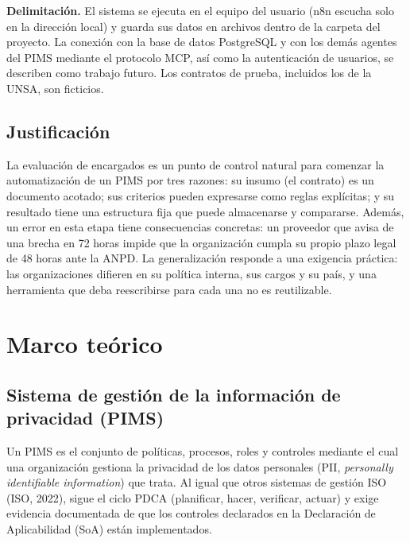 \documentclass[12pt,letterpaper]{article}
\begin{document}
\par\noindent \textbf{Delimitación.} El sistema se ejecuta en el equipo del usuario (n8n escucha solo en la dirección local) y guarda sus datos en archivos dentro de la carpeta del proyecto. La conexión con la base de datos PostgreSQL y con los demás agentes del PIMS mediante el protocolo MCP, así como la autenticación de usuarios, se describen como trabajo futuro. Los contratos de prueba, incluidos los de la UNSA, son ficticios.
\par

\subsection{Justificación}

La evaluación de encargados es un punto de control natural para comenzar la automatización de un PIMS por tres razones: su insumo (el contrato) es un documento acotado; sus criterios pueden expresarse como reglas explícitas; y su resultado tiene una estructura fija que puede almacenarse y compararse. Además, un error en esta etapa tiene consecuencias concretas: un proveedor que avisa de una brecha en 72 horas impide que la organización cumpla su propio plazo legal de 48 horas ante la ANPD. La generalización responde a una exigencia práctica: las organizaciones difieren en su política interna, sus cargos y su país, y una herramienta que deba reescribirse para cada una no es reutilizable.

\section{Marco teórico}

\subsection{Sistema de gestión de la información de privacidad (PIMS)}

Un PIMS es el conjunto de políticas, procesos, roles y controles mediante el cual una organización gestiona la privacidad de los datos personales (PII, \emph{personally identifiable information}) que trata. Al igual que otros sistemas de gestión ISO (ISO, 2022), sigue el ciclo PDCA (planificar, hacer, verificar, actuar) y exige evidencia documentada de que los controles declarados en la Declaración de Aplicabilidad (SoA) están implementados.
\end{document}
